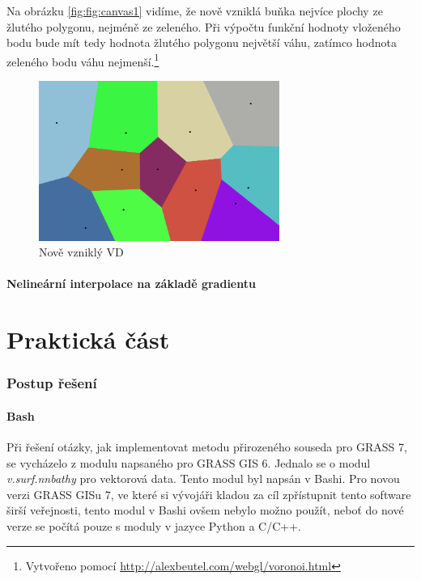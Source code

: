\documentclass[12pt,a4paper]{article}
\begin{document}
{Na obrázku \ref{fig:fig:canvas1} vidíme, že nově vzniklá buňka  nejvíce plochy ze žlutého polygonu, nejméně ze zeleného. Při výpočtu funkční hodnoty vloženého bodu bude mít tedy hodnota žlutého polygonu největší váhu, zatímco hodnota zeleného bodu váhu nejmenší.\footnote{Vytvořeno pomocí \url{http://alexbeutel.com/webgl/voronoi.html}}
\begin{figure}[h!]
\centering
\includegraphics[width=0.7\textwidth]{img/canvas_2.png}
\caption{Nově vzniklý VD}
\label{fig:fig:canvas2}
\end{figure}

\newpage

\subsection{Nelineární interpolace na základě gradientu}


\newpage	
\part{Praktická část}

\newpage
\section{Postup řešení}
\subsection{Bash}
\label{sub:Bash}

Při řešení otázky, jak implementovat metodu přirozeného souseda pro
GRASS 7, se vycházelo z modulu napsaného pro GRASS GIS 6. Jednalo se o
modul \emph{v.surf.nnbathy} pro vektorová data. Tento modul byl napsán
v Bashi. Pro novou verzi GRASS GISu 7, ve které si vývojáři kladou za
cíl zpřístupnit tento software širší veřejnosti, tento modul v Bashi
ovšem nebylo možno použít, neboť do nové verze se počítá pouze s
moduly v jazyce Python a C/C++.

}
\end{document}
